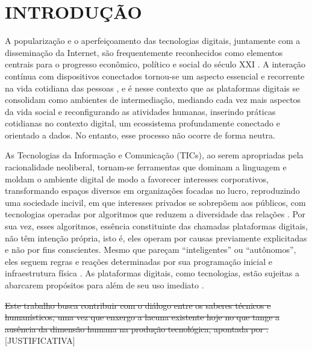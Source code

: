 




\chapter{INTRODUÇÃO}
\label{chap:introducao}

A popularização e o aperfeiçoamento das tecnologias digitais, juntamente com a disseminação da Internet, são frequentemente reconhecidos como elementos centrais para o progresso econômico, político e social do século XXI \cite{Silveira2021}. A interação contínua com dispositivos conectados tornou-se um aspecto essencial e recorrente na vida cotidiana das pessoas \cite{silveira-demcodigos}, e é nesse contexto que as plataformas digitais se consolidam como ambientes de intermediação, mediando cada vez mais aspectos da vida social e reconfigurando as atividades humanas, inserindo práticas cotidianas no contexto digital, um ecossistema profundamente conectado e orientado a dados. No entanto, esse processo não ocorre de forma neutra. 

As Tecnologias da Informação e Comunicação (TICs), ao serem apropriadas pela racionalidade neoliberal, tornam-se ferramentas que dominam a linguagem e moldam o ambiente digital de modo a favorecer interesses corporativos, transformando espaços diversos em organizações focadas no lucro, reproduzindo uma sociedade incivil, em que interesses privados se sobrepõem aos públicos, com tecnologias operadas por algoritmos que reduzem a diversidade das relações \cite{souza_sabbag_achilles_2024}. Por sua vez, esses algoritmos, essência constituinte das chamadas plataformas digitais, não têm intenção própria, isto é, eles operam por causas previamente explicitadas e não por fins conscientes. Mesmo que pareçam “inteligentes” ou “autônomos”, eles seguem regras e reações determinadas por sua programação inicial e infraestrutura física \cite{Faustino2023}. As plataformas digitais, como tecnologias, estão sujeitas a abarcarem propósitos para além de seu uso imediato \cite{Winner_2019}.

\sout{Este trabalho busca contribuir com o diálogo entre os saberes técnicos e humanísticos, uma vez que enxergo a lacuna existente hoje no que tange a ausência da dimensão humana na produção tecnológica, apontada por .} [JUSTIFICATIVA]

